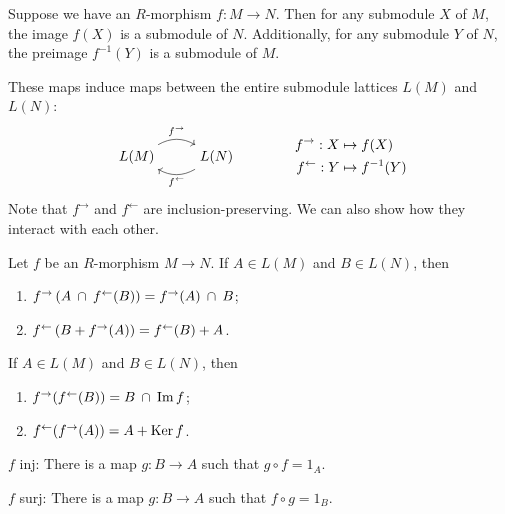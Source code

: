 \documentclass[twoside,10pt]{report}
\begin{document}
\begin{prop}
	Suppose we have an $R$-morphism $f:M\to N$. Then for any submodule $X$ of $M$, the image $f(X)$ is a submodule of $N$. Additionally, for any submodule $Y$ of $N$, the preimage $f^{-1}(Y)$ is a submodule of $ M$.
\end{prop}
These maps induce maps between the entire submodule lattices $L(M)$ and $L(N)$:
\begin{equation*}
	\begin{aligned}[c]
		\begin{tikzcd}
			L(M) \rar[bend left]{f^{\to }} & L(N) \lar[bend left]{f^{\leftarrow}}
		\end{tikzcd}
	\end{aligned}
	\qquad\qquad
	\begin{aligned}[c]
		f^{\to }: X &\mapsto f(X) \\
	f^{\leftarrow}: Y &\mapsto f^{-1}(Y)
	\end{aligned}
\end{equation*}
Note that $f^{\to }$ and $f^{\leftarrow}$ are inclusion-preserving. We can also show how they interact with each other.
\begin{prop}
	Let $f$ be an $R$-morphism $M\to N$. If $A \in L(M)$ and $B \in L(N)$, then
	\begin{enumerate}
		\item $f^{\to }\left( A \operatorname{\;\cap\;} f^{\leftarrow}(B) \right) = f^{\to }(A) \operatorname{\;\cap\;} B$;
		\item $f^{\leftarrow}\left( B + f^{\to }(A) \right) = f^{\leftarrow}(B) + A$.
	\end{enumerate}
\end{prop}
\begin{cor}
	If $A \in L(M)$ and $B \in L(N)$, then
	\begin{enumerate}
		\item $f^{\to }(f^{\leftarrow}(B)) = B \operatorname{\;\cap\;} \operatorname{Im} f$;
		\item $f^{\leftarrow}(f^{\to }(A)) = A + \operatorname{Ker} f$.
	\end{enumerate}
\end{cor}




{\color{blue}
	$f$ inj: There is a map $g:B\to A$ such that $g \circ f = 1_{A}$.

	$f$ surj: There is a map $g:B\to A$ such that $f \circ g = 1_{B}$.
}
\end{document}
